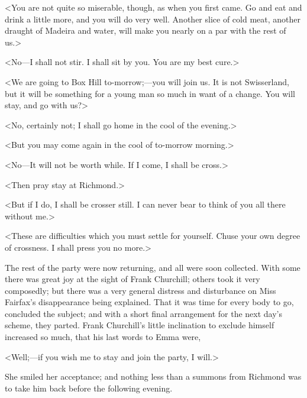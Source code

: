 <You are not quite so miserable, though, as when you first came. Go and eat and drink a little more, and you will do very well. Another slice of cold meat, another draught of Madeira and water, will make you nearly on a par with the rest of us.>

<No—I shall not stir. I shall sit by you. You are my best cure.>

<We are going to Box Hill to-morrow;—you will join us. It is not Swisserland, but it will be something for a young man so much in want of a change. You will stay, and go with us?>

<No, certainly not; I shall go home in the cool of the evening.>

<But you may come again in the cool of to-morrow morning.>

<No—It will not be worth while. If I come, I shall be cross.>

<Then pray stay at Richmond.>

<But if I do, I shall be crosser still. I can never bear to think of you all there without me.>

<These are difficulties which you must settle for yourself. Chuse your own degree of crossness. I shall press you no more.>

The rest of the party were now returning, and all were soon collected. With some there was great joy at the sight of Frank Churchill; others took it very composedly; but there was a very general distress and disturbance on Miss Fairfax's disappearance being explained. That it was time for every body to go, concluded the subject; and with a short final arrangement for the next day's scheme, they parted. Frank Churchill's little inclination to exclude himself increased so much, that his last words to Emma were,

<Well;—if you wish me to stay and join the party, I will.>

She smiled her acceptance; and nothing less than a summons from Richmond was to take him back before the following evening.